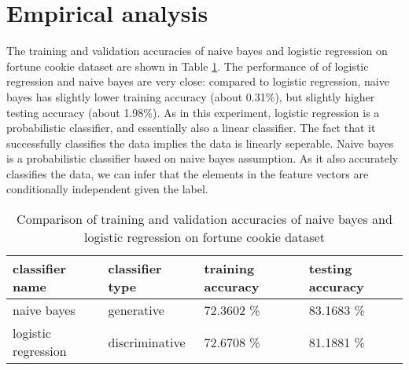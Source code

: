 \documentclass[12pt]{article}
\begin{document}
\section{Empirical analysis}
The training and validation accuracies of naive bayes and logistic regression on fortune cookie dataset are shown in Table \ref{tab:fortune}. The performance of of logistic regression and naive bayes are very close: compared to logistic regression, naive bayes has slightly lower training accuracy (about 0.31\%), but slightly higher testing accuracy (about 1.98\%). As in this experiment, logistic regression is a probabilistic classifier, and essentially also a linear classifier. The fact that it successfully classifies the data implies the data is linearly seperable. Naive bayes is a probabilistic classifier based on naive bayes assumption. As it also accurately classifies the data, we can infer that the elements in the feature vectors are conditionally independent given the label.
\begin{table}[htb]
  \centering
  \begin{tabularx}{\textwidth}{|X|X|X|X|} \hline
    classifier name & classifier type & training accuracy & testing accuracy \\ \hline
    naive bayes & generative & 72.3602 \% & 83.1683 \% \\ \hline
    logistic regression & discriminative & 72.6708 \% & 81.1881 \% \\ \hline
  \end{tabularx}
  \caption{Comparison of training and validation accuracies of naive bayes and logistic regression on fortune cookie dataset}
  \label{tab:fortune}
\end{table}


\end{document}
